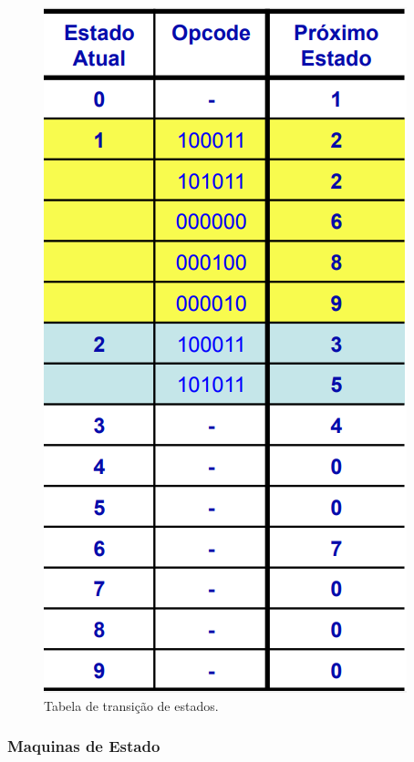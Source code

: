\documentclass{article}
\begin{document}
        \begin{figure}[H]
            \centering %
            \includegraphics[scale=0.31]{transicao_estados.png} %
            \caption{Tabela de transição de estados.}
            \label{figura:mips}
        \end{figure}

        \subsubsection{Maquinas de Estado}
\end{document}
